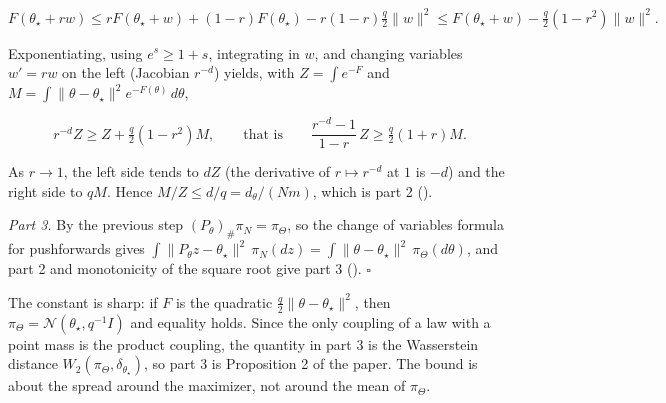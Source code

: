 \documentclass[11pt,a4paper]{report}
\begin{document}
\[F(\theta_\star+rw)\le rF(\theta_\star+w)+(1-r)F(\theta_\star)-r(1-r)\tfrac q2\|w\|^2\le F(\theta_\star+w)-\tfrac q2(1-r^2)\|w\|^2.\]


Exponentiating, using \(e^s\ge1+s\), integrating in \(w\), and changing variables \(w'=rw\) on the left (Jacobian \(r^{-d}\)) yields, with \(Z=\int e^{-F}\) and \(M=\int\|\theta-\theta_\star\|^2e^{-F(\theta)}\,d\theta\),


\[r^{-d}Z\ge Z+\tfrac q2(1-r^2)M,\qquad\text{that is}\qquad\frac{r^{-d}-1}{1-r}\,Z\ge\tfrac q2(1+r)M.\]


As \(r\to1\), the left side tends to \(dZ\) (the derivative of \(r\mapsto r^{-d}\) at \(1\) is \(-d\)) and the right side to \(qM\). Hence \(M/Z\le d/q=d_\theta/(Nm)\), which is part 2 (\cite[Section~3.6.1]{LangevinLean2026Proximal}).




\emph{Part 3.} By the previous step \((P_\theta)_\#\pi_N=\pi_\Theta\), so the change of variables formula for pushforwards gives \(\int\|P_\theta z-\theta_\star\|^2\,\pi_N(dz)=\int\|\theta-\theta_\star\|^2\,\pi_\Theta(d\theta)\), and part 2 and monotonicity of the square root give part 3 (\cite[Section~3.6.1]{LangevinLean2026Proximal}). \(\square\)




The constant is sharp: if \(F\) is the quadratic \(\frac q2\|\theta-\theta_\star\|^2\), then \(\pi_\Theta=\mathcal N(\theta_\star,q^{-1}I)\) and equality holds. Since the only coupling of a law with a point mass is the product coupling, the quantity in part 3 is the Wasserstein distance \(W_2(\pi_\Theta,\delta_{\theta_\star})\), so part 3 is Proposition 2 of the paper. The bound is about the spread around the maximizer, not around the mean of \(\pi_\Theta\).
\end{document}
